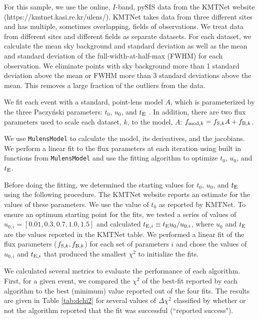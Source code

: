 \documentclass[preprint]{aastex631}
\begin{document}
For this sample, we use the online, $I$-band, pySIS \citep{Albrow09} data  from the KMTNet website (https://kmtnet.kasi.re.kr/ulens/). KMTNet takes data from three different sites and has multiple, sometimes overlapping, fields of observations. We treat data from different sites and different fields as separate datasets. For each dataset, we calculate the mean sky background and standard deviation as well as the mean and standard deviation of the full-width-at-half-max (FWHM) for each observation. We eliminate points with sky background more than 1 standard deviation above the mean or FWHM more than 3 standard deviations above the mean. This removes a large fraction of the outliers from the data.

We fit each event with a standard, point-lens model $A$, which is parameterized by the three Paczy\'{n}ski parameters: $t_0$, $u_0$, and $t_{\rm E}$ \citep[for the definitions of these parameters see, e.g.,][]{Gaudi12}. In addition, there are two flux parameters used to scale each dataset, $k$, to the model, $A$: 
$f_{{\rm mod}, k} = f_{{\rm S}, k} A + f_{{\rm B}, k}$.

We use \texttt{MulensModel} \citep{MulensModel} to calculate the model, its derivatives, and the jacobians.  We  perform a linear fit to the flux parameters at each iteration using built in functions from \texttt{MulensModel} and use the fitting algorithm to optimize $t_0$, $u_0$, and $t_{\rm E}$.

Before doing the fitting, we determined the starting values for $t_0$, $u_0$, and $t_{\rm E}$ using the following procedure. The KMTNet website reports an estimate for the values of these parameters. We use the value of $t_0$ as reported by KMTNet. To ensure an optimum starting point for the fits, we tested a series of values of $u_{0, i} = [0.01, 0.3, 0.7, 1.0, 1.5]$ and calculated $t_{{\rm E}, i} \equiv t_{\rm E} u_0 / u_{0, i}$, where $u_0$ and $t_{\rm E}$ are the values reported in the KMTNet table. We performed a linear fit of the flux parameters ($f_{{\rm S}, k}, f_{{\rm B}, k}$) for each set of parameters $i$ and chose the values of $u_{0, i}$ and $t_{{\rm E}, i}$ that produced the smallest $\chi^2$ to initialize the fits.

We calculated several metrics to evaluate the performance of each algorithm. First, for a given event, we compared the $\chi^2$ of the best-fit reported by each algorithm to the best (minimum) value reported out of the four fits. The results are given in Table \ref{tab:dchi2} for several values of $\Delta\chi^2$ classified by whether or not the algorithm reported that the fit was successful (``reported success").
\end{document}
